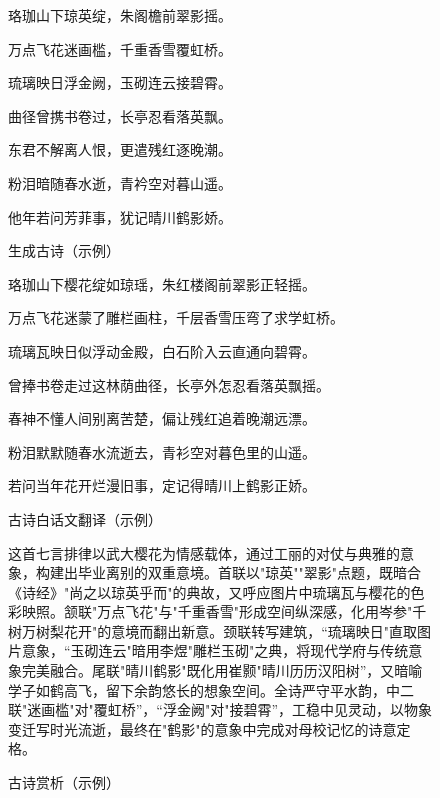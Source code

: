 \begin{figure}[ht]
  \centering
  \begin{tcolorbox}[
      colback=white,
      colframe=black,
      boxrule=1pt,
      arc=0mm,
      width=0.6\linewidth,  %
      ]
      \kaishu
      \centering
      珞珈山下琼英绽，朱阁檐前翠影摇。\par
      万点飞花迷画槛，千重香雪覆虹桥。\par
      琉璃映日浮金阙，玉砌连云接碧霄。\par
      曲径曾携书卷过，长亭忍看落英飘。\par
      东君不解离人恨，更遣残红逐晚潮。\par
      粉泪暗随春水逝，青衿空对暮山遥。\par
      他年若问芳菲事，犹记晴川鹤影娇。\par
  \end{tcolorbox}
  \caption{生成古诗（示例）}
  \label{fig:example_poem}
\end{figure}


\begin{figure}[ht]
  \centering
  \begin{tcolorbox}[
      colback=white,
      colframe=black,
      boxrule=1pt,
      arc=0mm,
      width=0.8\linewidth,  %
      ]
      \kaishu
      \centering
      珞珈山下樱花绽如琼瑶，朱红楼阁前翠影正轻摇。\par
      万点飞花迷蒙了雕栏画柱，千层香雪压弯了求学虹桥。\par
      琉璃瓦映日似浮动金殿，白石阶入云直通向碧霄。\par
      曾捧书卷走过这林荫曲径，长亭外怎忍看落英飘摇。\par
      春神不懂人间别离苦楚，偏让残红追着晚潮远漂。\par
      粉泪默默随春水流逝去，青衫空对暮色里的山遥。\par
      若问当年花开烂漫旧事，定记得晴川上鹤影正娇。\par
  \end{tcolorbox}
  \caption{古诗白话文翻译（示例）}
  \label{fig:example_translation} %
\end{figure}

\begin{figure}[ht]
  \begin{tcolorbox}[
      colback=white, %
      colframe=black, 
      boxrule=1pt,        %
      arc=0mm,             %
  ]
      \kaishu 这首七言排律以武大樱花为情感载体，通过工丽的对仗与典雅的意象，构建出毕业离别的双重意境。首联以"琼英""翠影"点题，既暗合《诗经》"尚之以琼英乎而"的典故，又呼应图片中琉璃瓦与樱花的色彩映照。颔联"万点飞花"与"千重香雪"形成空间纵深感，化用岑参"千树万树梨花开"的意境而翻出新意。颈联转写建筑，“琉璃映日"直取图片意象，“玉砌连云"暗用李煜"雕栏玉砌"之典，将现代学府与传统意象完美融合。尾联"晴川鹤影"既化用崔颢"晴川历历汉阳树”，又暗喻学子如鹤高飞，留下余韵悠长的想象空间。全诗严守平水韵，中二联"迷画槛"对"覆虹桥”，“浮金阙"对"接碧霄”，工稳中见灵动，以物象变迁写时光流逝，最终在"鹤影"的意象中完成对母校记忆的诗意定格。
  \end{tcolorbox}
  \caption{古诗赏析（示例）}
  \label{fig:example_appreciation} %
\end{figure}

